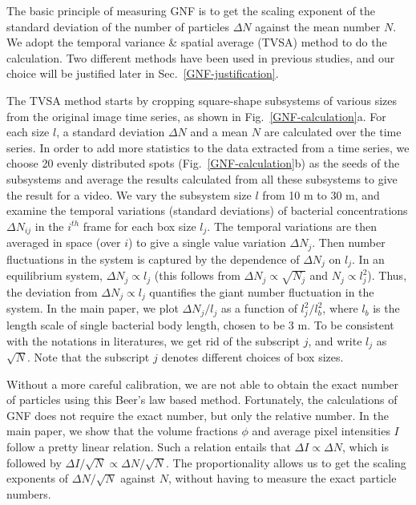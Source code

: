 \documentclass[preprint,aps,prl,amsmath,amssymb,longbibliography]{revtex4-2}
\begin{document}
The basic principle of measuring GNF is to get the scaling exponent of the standard deviation of the number of particles $\Delta N$ against the mean number $N$. We adopt the temporal variance \& spatial average (TVSA) method to do the calculation. Two different methods have been used in previous studies, and our choice will be justified later in Sec.~\ref{GNF-justification}.

The TVSA method starts by cropping square-shape subsystems of various sizes from the original image time series, as shown in Fig.~\ref{GNF-calculation}a. For each size $l$, a standard deviation $\Delta N$ and a mean $N$ are calculated over the time series. In order to add more statistics to the data extracted from a time series, we choose 20 evenly distributed spots (Fig.~\ref{GNF-calculation}b) as the seeds of the subsystems and average the results calculated from all these subsystems to give the result for a video. We vary the subsystem size $l$ from 10 \textmu m to 30 \textmu m, and examine the temporal variations (standard deviations) of bacterial concentrations $\Delta N_{ij}$ in the $i^{th}$ frame for each box size $l_j$. The temporal variations are then averaged in space (over $i$) to give a single value variation $\Delta N_{j}$.
Then number fluctuations in the system is captured by the dependence of $\Delta N_{j}$ on $l_j$. In an equilibrium system, $\Delta N_{j}\propto l_j$ (this follows from $\Delta N_{j}\propto \sqrt{N_j}$ and $N_j\propto l_j^2$).
Thus, the deviation from $\Delta N_{j}\propto l_j$ quantifies the giant number fluctuation in the system.
In the main paper, we plot $\Delta N_{j}/l_j$ as a function of $l_j^2/l_b^2$, where $l_b$ is the length scale of single bacterial body length, chosen to be 3 \textmu m.
To be consistent with the notations in literatures, we get rid of the subscript $j$, and write $l_j$ as $\sqrt{N}$.
Note that the subscript $j$ denotes different choices of box sizes.

Without a more careful calibration, we are not able to obtain the exact number of particles using this Beer's law based method. Fortunately, the calculations of GNF does not require the exact number, but only the relative number. In the main paper, we show that the volume fractions $\phi$ and average pixel intensities $I$ follow a pretty linear relation. Such a relation entails that $\Delta I \propto \Delta N$, which is followed by $\Delta I/\sqrt N \propto \Delta N/\sqrt N$. The proportionality allows us to get the scaling exponents of $\Delta N/\sqrt N$ against $N$, without having to measure the exact particle numbers.
\end{document}
